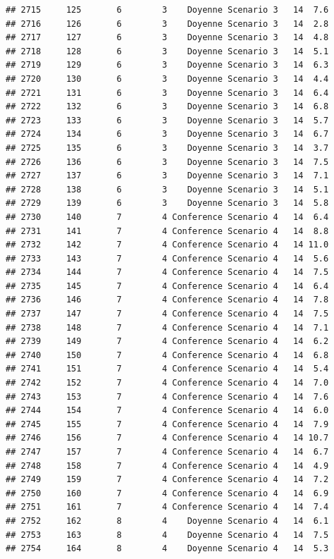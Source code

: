 \documentclass[
]{article}
\begin{document}
\begin{verbatim}
## 2715     125       6        3    Doyenne Scenario 3   14  7.6
## 2716     126       6        3    Doyenne Scenario 3   14  2.8
## 2717     127       6        3    Doyenne Scenario 3   14  4.8
## 2718     128       6        3    Doyenne Scenario 3   14  5.1
## 2719     129       6        3    Doyenne Scenario 3   14  6.3
## 2720     130       6        3    Doyenne Scenario 3   14  4.4
## 2721     131       6        3    Doyenne Scenario 3   14  6.4
## 2722     132       6        3    Doyenne Scenario 3   14  6.8
## 2723     133       6        3    Doyenne Scenario 3   14  5.7
## 2724     134       6        3    Doyenne Scenario 3   14  6.7
## 2725     135       6        3    Doyenne Scenario 3   14  3.7
## 2726     136       6        3    Doyenne Scenario 3   14  7.5
## 2727     137       6        3    Doyenne Scenario 3   14  7.1
## 2728     138       6        3    Doyenne Scenario 3   14  5.1
## 2729     139       6        3    Doyenne Scenario 3   14  5.8
## 2730     140       7        4 Conference Scenario 4   14  6.4
## 2731     141       7        4 Conference Scenario 4   14  8.8
## 2732     142       7        4 Conference Scenario 4   14 11.0
## 2733     143       7        4 Conference Scenario 4   14  5.6
## 2734     144       7        4 Conference Scenario 4   14  7.5
## 2735     145       7        4 Conference Scenario 4   14  6.4
## 2736     146       7        4 Conference Scenario 4   14  7.8
## 2737     147       7        4 Conference Scenario 4   14  7.5
## 2738     148       7        4 Conference Scenario 4   14  7.1
## 2739     149       7        4 Conference Scenario 4   14  6.2
## 2740     150       7        4 Conference Scenario 4   14  6.8
## 2741     151       7        4 Conference Scenario 4   14  5.4
## 2742     152       7        4 Conference Scenario 4   14  7.0
## 2743     153       7        4 Conference Scenario 4   14  7.6
## 2744     154       7        4 Conference Scenario 4   14  6.0
## 2745     155       7        4 Conference Scenario 4   14  7.9
## 2746     156       7        4 Conference Scenario 4   14 10.7
## 2747     157       7        4 Conference Scenario 4   14  6.7
## 2748     158       7        4 Conference Scenario 4   14  4.9
## 2749     159       7        4 Conference Scenario 4   14  7.2
## 2750     160       7        4 Conference Scenario 4   14  6.9
## 2751     161       7        4 Conference Scenario 4   14  7.4
## 2752     162       8        4    Doyenne Scenario 4   14  6.1
## 2753     163       8        4    Doyenne Scenario 4   14  7.5
## 2754     164       8        4    Doyenne Scenario 4   14  5.3

\end{verbatim}
\end{document}
